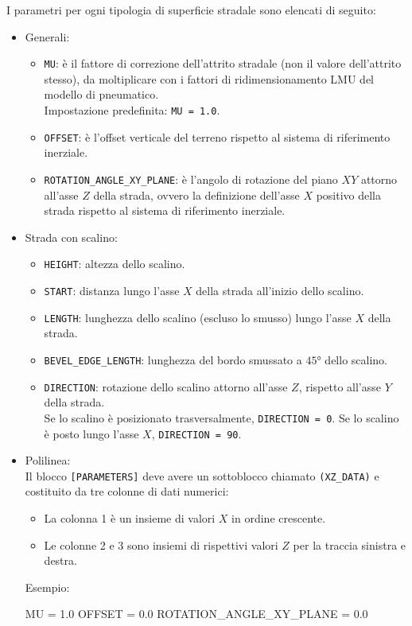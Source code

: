 I parametri per ogni tipologia di superficie stradale sono elencati di seguito:
\begin{itemize}
	\item Generali:
	\begin{itemize}
		\item \texttt{MU}: è il fattore di correzione dell'attrito stradale (non il valore dell'attrito stesso), da moltiplicare con i fattori di ridimensionamento LMU del modello di pneumatico.\\
		Impostazione predefinita: \texttt{MU = 1.0}.
		\item \texttt{OFFSET}: è l'offset verticale del terreno rispetto al sistema di riferimento inerziale.
		\item \texttt{ROTATION\_ANGLE\_XY\_PLANE}: è l'angolo di rotazione del piano $XY$ attorno all'asse $Z$ della strada, ovvero la definizione dell'asse $X$ positivo della strada rispetto al sistema di riferimento inerziale.
	\end{itemize}
	\item Strada con scalino:
	\begin{itemize}
		\item \texttt{HEIGHT}: altezza dello scalino.
		\item \texttt{START}: distanza lungo l'asse $X$ della strada all'inizio dello scalino.
		\item \texttt{LENGTH}: lunghezza dello scalino (escluso lo smusso) lungo l'asse $X$ della strada.
		\item \texttt{BEVEL\_EDGE\_LENGTH}: lunghezza del bordo smussato a $45°$ dello scalino.
		\item \texttt{DIRECTION}: rotazione dello scalino attorno all'asse $Z$, rispetto all'asse $Y$ della strada.\\
		Se lo scalino è posizionato trasversalmente, \texttt{DIRECTION = 0}. Se lo scalino è posto lungo l'asse $X$, \texttt{DIRECTION = 90}.
	\end{itemize}
	\item Polilinea:\\
	Il blocco \texttt{[PARAMETERS]} deve avere un sottoblocco chiamato \texttt{(XZ\_DATA)} e costituito da tre colonne di dati numerici:
	\begin{itemize}
		\item La colonna 1 è un insieme di valori $X$ in ordine crescente.
		\item Le colonne 2 e 3 sono insiemi di rispettivi valori $Z$ per la traccia sinistra e destra.
	\end{itemize}
	Esempio:
	\begin{pseudoc}
	[PARAMETERS]
	MU = 1.0
	OFFSET = 0.0
	ROTATION_ANGLE_XY_PLANE = 0.0 
	

\end{pseudoc}
\end{itemize}
